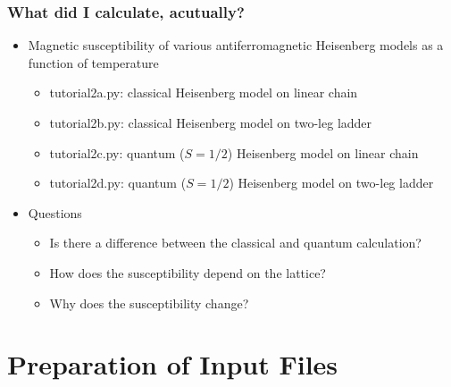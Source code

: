 \begin{frame}[t,fragile]
  \frametitle{What did I calculate, acutually?}
  \begin{itemize}
  \item Magnetic susceptibility of various antiferromagnetic Heisenberg models as a function of temperature
    \begin{itemize}
    \item tutorial2a.py: classical Heisenberg model on linear chain
    \item tutorial2b.py: classical Heisenberg model on two-leg ladder
    \item tutorial2c.py: quantum ($S=1/2$) Heisenberg model on linear chain
    \item tutorial2d.py: quantum ($S=1/2$) Heisenberg model on two-leg ladder
    \end{itemize}
  \item Questions
    \begin{itemize}
      \item Is there a difference between the classical and quantum calculation?
      \item How does the susceptibility depend on the lattice?
      \item Why does the susceptibility change?
    \end{itemize}
  \end{itemize}
\end{frame}

\section{Preparation of Input Files}
\subsection*{\redm\whiteb\greenb}

